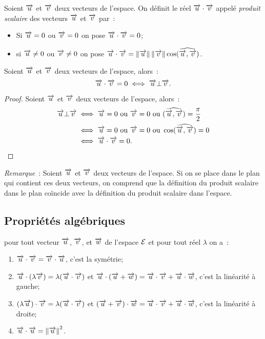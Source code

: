 \begin{defdef}
  Soient \(\vu\) et \(\vv\) deux vecteurs de l'espace. On définit le réel
  \(\vu\cdot\vv\) appelé \emph{produit scalaire} des vecteurs \(\vu\) et \(\vv\)
  par~:
  \begin{itemize}
    \item Si \(\vu = 0\) ou \(\vv = 0\) on pose \(\vu\cdot\vv = 0\);
    \item si \(\vu\neq 0\) ou \(\vv\neq 0\) on pose \(\vu\cdot\vv =
      \norme{\vu}\norme{\vv}\cos(\widehat{\vu, \vv})\).
  \end{itemize}
\end{defdef}

\begin{prop}
  Soient \(\vu\) et \(\vv\) deux vecteurs de l'espace, alors~:
  \begin{equation}
    \vu\cdot\vv = 0 \iff \vu \bot \vv.
  \end{equation}
\end{prop}

\begin{proof}
  Soient \(\vu\) et \(\vv\) deux vecteurs de l'espace, alors~:
  \begin{align}
    \vu \bot \vv &\iff \vu = 0 \text{~ou~} \vv = 0 \text{~ou~} (\widehat{\vu,
    \vv}) = \frac{\pi}{2}\\
                 &\iff \vu = 0 \text{~ou~} \vv = 0 \text{~ou~}
                 \cos(\widehat{\vu, \vv}) = 0\\
                 &\iff \vu\cdot\vv = 0.
  \end{align}
\end{proof}

\emph{Remarque}~: Soient \(\vu\) et \(\vv\) deux vecteurs de l'espace. Si on
se place dans le plan qui contient ces deux vecteurs, on comprend que la
définition du produit scalaire dans le plan coïncide avec la définition du
produit scalaire dans l'espace.

\subsection{Propriétés algébriques}
\begin{prop}
  \label{prop:propalgprodsc}
  pour tout vecteur \(\vu\), \(\vv\), et \(\vw\) de l'espace \(\E\) et pour
  tout réel \(\lambda\) on a~:
  \begin{enumerate}
    \item \(\vu\cdot\vv = \vv\cdot\vu\), c'est la symétrie;
    \item \(\vu\cdot(\lambda\vv) = \lambda(\vu\cdot\vv)\) et \(\vu\cdot(\vu +
      \vw) = \vu\cdot\vv + \vu\cdot\vw\), c'est la linéarité à gauche;
    \item \((\lambda\vu)\cdot\vv = \lambda(\vu\cdot\vv)\) et \((\vu +
      \vv)\cdot\vw = \vu\cdot\vv + \vu\cdot\vw\), c'est la linéarité à droite;
    \item \(\vu\cdot\vu = \norme{\vu}^2\).
  \end{enumerate}
\end{prop}

